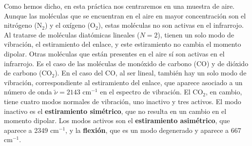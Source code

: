 \documentclass{tufte-book}
\begin{document}
Como hemos dicho, en esta práctica nos centraremos en una muestra de aire.
Aunque  las moléculas que se encuentran en el aire en mayor concentración 
son el nitrógeno (N$_2$) y el oxígeno (O$_2$), estas moléculas no son activas 
en el infrarrojo. Al tratarse de moléculas diatómicas lineales ($N=2$), 
tienen un solo modo de vibración, el estiramiento del enlace, y este 
estiramiento no cambia el momento dipolar. Otras moléculas que están 
presentes en el aire sí son activas en el infrarrojo. Es el caso de las 
moléculas de monóxido de carbono (CO) y de dióxido de carbono (CO$_2$).
En el caso del CO, al ser lineal, también hay un solo modo de vibración,
correspondiente al estiramiento del enlace, que aparece asociado a un 
número de onda $\tilde{\nu}=2143$ cm$^{-1}$
en el espectro de vibración. El CO$_2$, en cambio, tiene cuatro modos 
normales de vibración, uno inactivo y tres activos. El modo inactivo es el 
\textbf{estiramiento simétrico}, que no resulta en un cambio en el momento
dipolar. Los modos activos son el \textbf{estiramiento asimétrico}, que
aparece a 2349 cm$^{-1}$, y la \textbf{flexión}, que es un modo degenerado y
aparece a 667 cm$^{-1}$.
\end{document}
